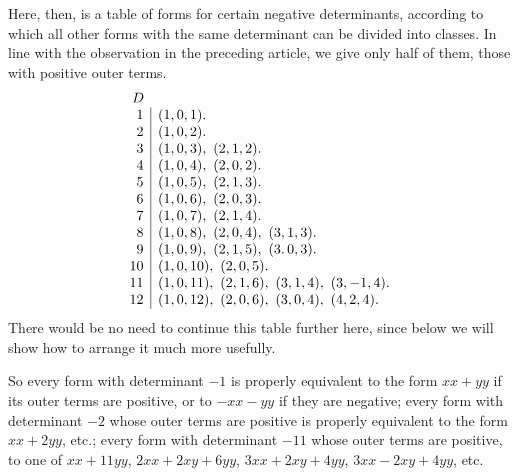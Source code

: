 Here, then, is a table of forms for certain negative determinants, according to which all other forms with the same determinant can be divided into classes. In line with the observation in the preceding article, we give only half of them, those with positive outer terms.
\[
\begin{array}{r|l}
\multicolumn{1}{r}{D}&\\
1&(1,0,1).\\
2&(1,0,2).\\
3&(1,0,3),\ (2,1,2).\\
4&(1,0,4),\ (2,0,2).\\
5&(1,0,5),\ (2,1,3).\\
6&(1,0,6),\ (2,0,3).\\
7&(1,0,7),\ (2,1,4).\\
8&(1,0,8),\ (2,0,4),\ (3,1,3).\\
9&(1,0,9),\ (2,1,5),\ (3.\,0,3).\\
10&(1,0,10),\ (2,0,5).\\
11&(1,0,11),\ (2,1,6),\ (3,1,4),\ (3,-1,4).\\
12&(1,0,12),\ (2,0,6),\ (3,0,4),\ (4,2,4).
\end{array}
\]
There would be no need to continue this table further here, since below we will show how to arrange it much more usefully.

So every form with determinant $-1$ is properly equivalent to the form $xx+yy$ if its outer terms are positive, or to $-xx-yy$ if they are negative; every form with determinant $-2$ whose outer terms are positive is properly equivalent to the form $xx+2yy$, etc.; every form with determinant $-11$ whose outer terms are positive, to one of $xx+11yy$, $2xx+2xy+6yy$, $3xx+2xy+4yy$, $3xx-2xy+4yy$, etc.
